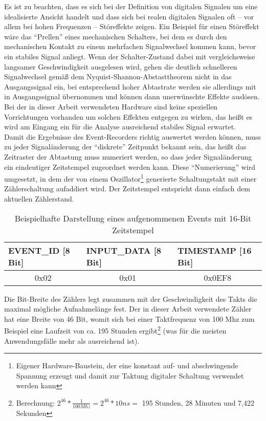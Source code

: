 Es ist zu beachten, dass es sich bei der Definition von digitalen Signalen um eine idealisierte Ansicht handelt und dass sich bei realen digitalen Signalen oft -- vor allem bei hohen Frequenzen -- Störeffekte zeigen. Ein Beispiel für einen Störeffekt wäre das ``Prellen'' eines mechanischen Schalters, bei dem es durch den mechanischen Kontakt zu einem mehrfachen Signalwechsel kommen kann, bevor ein stabiles Signal anliegt. Wenn der Schalter-Zustand dabei mit vergleichsweise langsamer Geschwindigkeit ausgelesen wird, gehen die deutlich schnelleren Signalwechsel gemäß dem Nyquist-Shannon-Abstasttheorem nicht in das Ausgangssignal ein, bei entsprechend hoher Abtastrate werden sie allerdings mit in Ausgangssignal übernommen und können dann unerwünschte Effekte auslösen.\\
Bei der in dieser Arbeit verwendeten Hardware sind keine speziellen Vorrichtungen vorhanden um solchen Effekten entgegen zu wirken, das heißt es wird am Eingang ein für die Analyse ausreichend stabiles Signal erwartet.   \\

Damit die Ergebnisse des Event-Recorders richtig auswertet werden können, muss zu jeder Signaländerung der ``diskrete'' Zeitpunkt bekannt sein, das heißt das Zeitraster der Abtastung muss numeriert werden, so dass jeder Signaländerung ein eindeutiger Zeitstempel zugeordnet werden kann.
Diese ``Numerierung'' wird umgesetzt, in dem der von einem Oszillator\footnote{Eigener Hardware-Baustein, der eine konstant auf- und abschwingende Spannung erzeugt und damit zur Taktung digitaler Schaltung verwendet werden kann} generierte Schaltungstakt mit einer Zählerschaltung aufaddiert wird. Der Zeitstempel entspricht dann einfach dem aktuellen Zählerstand.\\


\begin{table}[h]
\centering
\begin{tabular}{|l|l|l|}
\hline
\rowcolor[HTML]{EFEFEF} 
	EVENT\_ID [8 Bit] & INPUT\_DATA [8 Bit] & TIMESTAMP [16 Bit]\\ \hline
	\multicolumn{1}{|c|}{0x02} & \multicolumn{1}{c|}{0x01} & \multicolumn{1}{c|}{0x0EF8} \\ \hline
\end{tabular}
\caption{Beispielhafte Darstellung eines aufgenommenen Events mit 16-Bit Zeitstempel}
\label{my-label}
\end{table}


Die Bit-Breite des Zählers legt zusammen mit der Geschwindigkeit des Takts die maximal mögliche Aufnahmelänge fest. Der in dieser Arbeit verwendete Zähler hat eine Breite von 46 Bit, womit sich bei einer Taktfrequenz von 100 Mhz zum Beispiel eine Laufzeit von ca. 195 Stunden ergibt\footnote{Berechnung: \(2^{46} * \frac{1}{100 Mhz} = 2^{46} * 10 ns =\) 195 Stunden, 28 Minuten und 7,422 Sekunden} (was für die meisten Anwendungsfälle mehr als ausreichend ist). 



